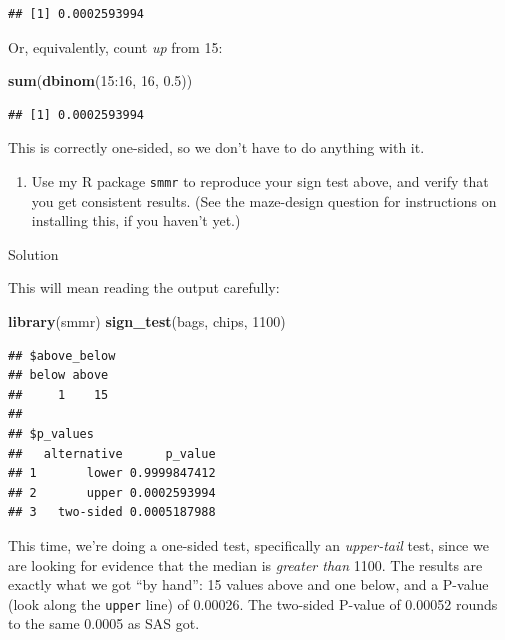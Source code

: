\documentclass[]{tufte-book}
\newenvironment{Shaded}{}{}
\newcommand{\DecValTok}[1]{\textcolor[rgb]{0.25,0.63,0.44}{#1}}
\newcommand{\FloatTok}[1]{\textcolor[rgb]{0.25,0.63,0.44}{#1}}
\newcommand{\KeywordTok}[1]{\textcolor[rgb]{0.00,0.44,0.13}{\textbf{#1}}}
\newcommand{\NormalTok}[1]{#1}
\newcommand{\OperatorTok}[1]{\textcolor[rgb]{0.40,0.40,0.40}{#1}}
\providecommand{\tightlist}{%
  \setlength{\itemsep}{0pt}\setlength{\parskip}{0pt}}
\theoremstyle{definition}
\theoremstyle{definition}
\theoremstyle{definition}
\theoremstyle{remark}
\begin{document}
\begin{verbatim}
## [1] 0.0002593994
\end{verbatim}

Or, equivalently, count \emph{up} from 15:

\begin{Shaded}
\begin{Highlighting}[]
\KeywordTok{sum}\NormalTok{(}\KeywordTok{dbinom}\NormalTok{(}\DecValTok{15}\OperatorTok{:}\DecValTok{16}\NormalTok{, }\DecValTok{16}\NormalTok{, }\FloatTok{0.5}\NormalTok{))}
\end{Highlighting}
\end{Shaded}

\begin{verbatim}
## [1] 0.0002593994
\end{verbatim}

This is correctly one-sided, so we don't have to do anything with it.

\begin{enumerate}
\def\labelenumi{(\alph{enumi})}
\setcounter{enumi}{2}
\tightlist
\item
  Use my R package \texttt{smmr} to reproduce your sign test above, and
  verify that you get consistent results. (See the maze-design question
  for instructions on installing this, if you haven't yet.)
\end{enumerate}

Solution

This will mean reading the output carefully:

\begin{Shaded}
\begin{Highlighting}[]
\KeywordTok{library}\NormalTok{(smmr)}
\KeywordTok{sign_test}\NormalTok{(bags, chips, }\DecValTok{1100}\NormalTok{)}
\end{Highlighting}
\end{Shaded}

\begin{verbatim}
## $above_below
## below above 
##     1    15 
## 
## $p_values
##   alternative      p_value
## 1       lower 0.9999847412
## 2       upper 0.0002593994
## 3   two-sided 0.0005187988
\end{verbatim}

This time, we're doing a one-sided test, specifically an
\emph{upper-tail} test, since we are looking for evidence that the
median is \emph{greater than} 1100. The results are exactly what we got
``by hand'': 15 values above and one below, and a P-value (look along
the \texttt{upper} line) of 0.00026. The two-sided P-value of 0.00052
rounds to the same 0.0005 as SAS got.
\end{document}
